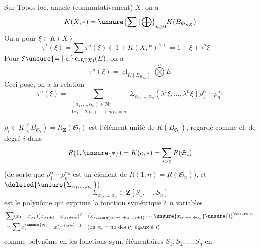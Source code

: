 Sur Topos loc. annelé (commutativement) $X$, on a
\[
K(X,*)=\unsure{\sum|\bigoplus}_{n\geq0}K(B_{\mathfrak S_{nX}})
\]
On a pour $\xi\in K(X)$
\[
\tau^*(\xi)=\sum\tau^n(\xi)\in1+K(X,*)^{\wedge+}=1+\xi+\tau^2\xi\ \text{---}
\]
Pour $\xi\unsure{=|\in}\operatorname{cl}_{K(X)}(E)$, on a
\[
\tau^n(\xi)=\operatorname{cl}_{K(B_{\mathfrak S_{nX}})}\overset{n}{\bigotimes}E
\]
Ceci posé, on a la relation
\[
\tau^n(\xi)=\sum_{\substack{(\alpha_1,\ldots,\alpha_n)\in\mathbf N^n\\1\alpha_1+2\alpha_2+\cdots+n\alpha_n=n}}
\Sigma_{\alpha_1,\ldots,\alpha_n}(\lambda^1\xi,\ldots,\lambda^n\xi)\rho_1^{\alpha_1}\cdots\rho_n^{\alpha_n}
\]

$\rho_i\in K(B_{\mathfrak S_i})=R_{\mathbf Z}(\mathfrak S_i)$ est l'élément
unité de $K(B_{\mathfrak S_i})$, regardé comme él. de
degré $i$ dans
\[
R(1,\unsure{*})=K(e,*)=\sum_{i\geq0}R(\mathfrak S_i)
\]
(de sorte que $\rho_1^{\alpha_1}\cdots\rho_n^{\alpha_n}$ est un élément de
$R(1,n)=R(\mathfrak S_n)$), et $\deleted{\unsure{\Sigma_{\alpha_1,\ldots,\alpha_n}}}$
\[
\Sigma_{\alpha_1,\ldots,\alpha_n}\in\mathbf Z[S_1,\text{---},S_n]
\]
est le polynôme  qui exprime la fonction
symétrique à $n$ variables
\[
\begin{aligned}
&\sum(x_1\text{---}x_{\alpha_1})(x_{\alpha_1+1}\text{---}x_{\alpha_1+\alpha_2})^2\text{---}
\bigl(x_{\unsure{\alpha_1+\cdots+\alpha_{n-1}+1}}\cdots\unsure{x_{\alpha_1+\cdots+\alpha_n}}\unsure{)}^{\unsure{n}}\\
&=\sum x_1^{\unsure{\nu_1}}\text{---}x_n^{\unsure{\nu_n}}\quad(\text{où }\alpha_i=\text{nb des }\nu_j\text{ égaux à }i)
\end{aligned}
\]
comme polynôme en les fonctions sym.
élémentaires $S_1,S_2,\ldots,S_n$ en
